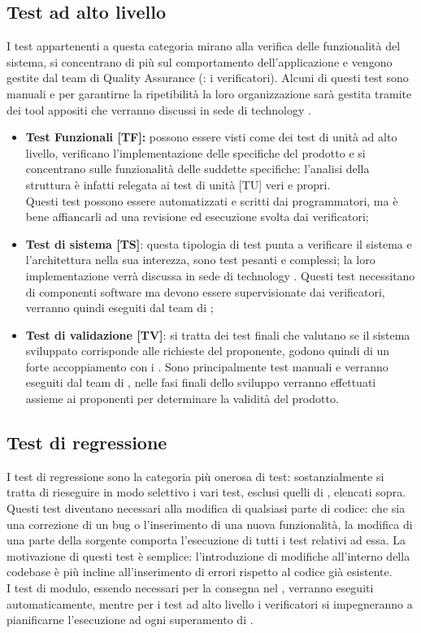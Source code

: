 \documentclass[PianoDiProgetto.tex]{subfiles}
\begin{document}
\subsection{Test ad alto livello}
I test appartenenti a questa categoria mirano alla verifica delle funzionalità del sistema, si concentrano di più sul comportamento dell'applicazione e vengono gestite dal team di Quality Assurance (: i verificatori).
Alcuni di questi test sono manuali e per garantirne la ripetibilità la loro organizzazione sarà gestita tramite dei tool appositi che verranno discussi in sede di technology .
\begin{itemize}
	\item \textbf{Test Funzionali [TF]:} possono essere visti come dei test di unità ad alto livello, verificano l'implementazione delle specifiche del prodotto e si concentrano sulle funzionalità delle suddette specifiche: l'analisi della struttura è infatti relegata ai test di unità [TU] veri e propri. \\
	Questi test possono essere automatizzati e scritti dai programmatori, ma è bene affiancarli ad una revisione ed esecuzione svolta dai verificatori;
	\item \textbf{Test di sistema [TS]}: questa tipologia di test punta a verificare il sistema e l'architettura nella sua interezza, sono test pesanti e complessi; la loro implementazione verrà discussa in sede di technology . 
	Questi test necessitano di componenti software ma devono essere supervisionate dai verificatori, verranno quindi eseguiti dal team di ;
	\item \textbf{Test di validazione [TV]}: si tratta dei test finali che valutano se il sistema sviluppato corrisponde alle richieste del proponente, godono quindi di un forte accoppiamento con i . Sono principalmente test manuali e verranno eseguiti dal team di , nelle fasi finali dello sviluppo verranno effettuati assieme ai proponenti per determinare la validità del prodotto.
\end{itemize}

\subsection{Test di regressione}
I test di regressione sono la categoria più onerosa di test: sostanzialmente si tratta di rieseguire in modo selettivo i vari test, esclusi quelli di , elencati sopra.\\
Questi test diventano necessari alla modifica di qualsiasi parte di codice: che sia una correzione di un bug o l'inserimento di una nuova funzionalità, la modifica di una parte della sorgente comporta l'esecuzione di tutti i test relativi ad essa. La motivazione di questi test è semplice: l'introduzione di modifiche all'interno della codebase è più incline all'inserimento di errori rispetto al codice già esistente.\\
I test di modulo, essendo necessari per la consegna nel , verranno eseguiti automaticamente, mentre per i test ad alto livello i verificatori si impegneranno a pianificarne l'esecuzione ad ogni superamento di .
	
\end{document}
